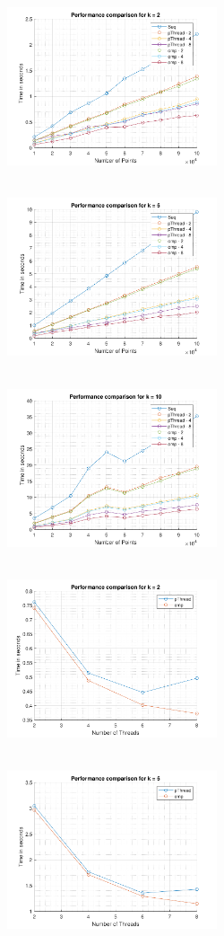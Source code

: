 \documentclass[letter, 11pt, margin=1in]{article}
\begin{document}
\begin{figure}[H]
    \centering
    \includegraphics[width=6.2cm,height=5.5cm]{k2}
    \includegraphics[width=6.2cm,height=5.5cm]{k5}
    \includegraphics[width=6.2cm,height=5.5cm]{k10}\\
    \includegraphics[width=6.2cm,height=5.5cm]{tk2}
    \includegraphics[width=6.2cm,height=5.5cm]{tk5}

\end{figure}
\end{document}
